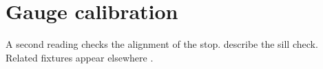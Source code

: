 \documentclass{article}
\begin{document}
\section*{Gauge calibration}
A second reading checks the alignment of the stop.
\citet{scale} describe the sill check. Related fixtures appear elsewhere \citep{bench,flap}.
\nocite{atlas,guide,lining}

\end{document}
